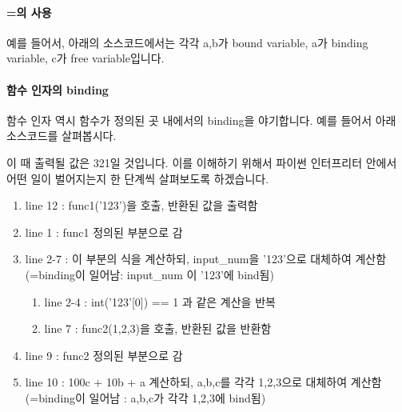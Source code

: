 

\paragraph{=의 사용} 

예를 들어서, 아래의 소스코드에서는 각각 a,b가 bound variable, a가 binding variable, c가 free variable입니다. 


\paragraph{함수 인자의 binding} 

함수 인자 역시 함수가 정의된 곳 내에서의 binding을 야기합니다. 예를 들어서 아래 소스코드를 살펴봅시다. 


                
이 때 출력될 값은 321일 것입니다. 이를 이해하기 위해서 파이썬 인터프리터 안에서 어떤 일이 벌어지는지 한 단계씩 살펴보도록 하겠습니다. 

\begin{enumerate} 
\item line 12 : func1('123')을 호출, 반환된 값을 출력함
\item line 1 : func1 정의된 부분으로 감
\item line 2-7 : 이 부분의 식을 계산하되, input\_num을 '123'으로 대체하여 계산함 (=binding이 일어남: input\_num 이 '123'에 bind됨)
\begin{enumerate}
\item line 2-4 : int('123'[0]) == 1 과 같은 계산을 반복 
\item line 7 : func2(1,2,3)을 호출, 반환된 값을 반환함
\end{enumerate}
\item line 9 : func2 정의된 부분으로 감 
\item line 10 : 100c + 10b + a 계산하되, a,b,c를 각각 1,2,3으로 대체하여 계산함 (=binding이 일어남 : a,b,c가 각각 1,2,3에 bind됨)
\end{enumerate}










